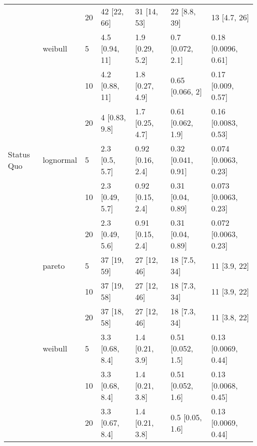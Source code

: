 \begin{tabular}{lllllll}
           &         & 20 &           42 [22, 66] &           31 [14, 53] &          22 [8.8, 39] &           13 [4.7, 26] \\
           & weibull & 5  &        4.5 [0.94, 11] &       1.9 [0.29, 5.2] &      0.7 [0.072, 2.1] &    0.18 [0.0096, 0.61] \\
           &         & 10 &        4.2 [0.88, 11] &       1.8 [0.27, 4.9] &       0.65 [0.066, 2] &     0.17 [0.009, 0.57] \\
           &         & 20 &         4 [0.83, 9.8] &       1.7 [0.25, 4.7] &     0.61 [0.062, 1.9] &    0.16 [0.0083, 0.53] \\
Status Quo & lognormal & 5  &        2.3 [0.5, 5.7] &      0.92 [0.16, 2.4] &    0.32 [0.041, 0.91] &   0.074 [0.0063, 0.23] \\
           &         & 10 &       2.3 [0.49, 5.7] &      0.92 [0.15, 2.4] &     0.31 [0.04, 0.89] &   0.073 [0.0063, 0.23] \\
           &         & 20 &       2.3 [0.49, 5.6] &      0.91 [0.15, 2.4] &     0.31 [0.04, 0.89] &   0.072 [0.0063, 0.23] \\
           & pareto & 5  &           37 [19, 59] &           27 [12, 46] &          18 [7.5, 34] &           11 [3.9, 22] \\
           &         & 10 &           37 [19, 58] &           27 [12, 46] &          18 [7.3, 34] &           11 [3.9, 22] \\
           &         & 20 &           37 [18, 58] &           27 [12, 46] &          18 [7.3, 34] &           11 [3.8, 22] \\
           & weibull & 5  &       3.3 [0.68, 8.4] &       1.4 [0.21, 3.9] &     0.51 [0.052, 1.5] &    0.13 [0.0069, 0.44] \\
           &         & 10 &       3.3 [0.68, 8.4] &       1.4 [0.21, 3.8] &     0.51 [0.052, 1.6] &    0.13 [0.0068, 0.45] \\
           &         & 20 &       3.3 [0.67, 8.4] &       1.4 [0.21, 3.8] &       0.5 [0.05, 1.6] &    0.13 [0.0069, 0.44] \\
\bottomrule
\end{tabular}

